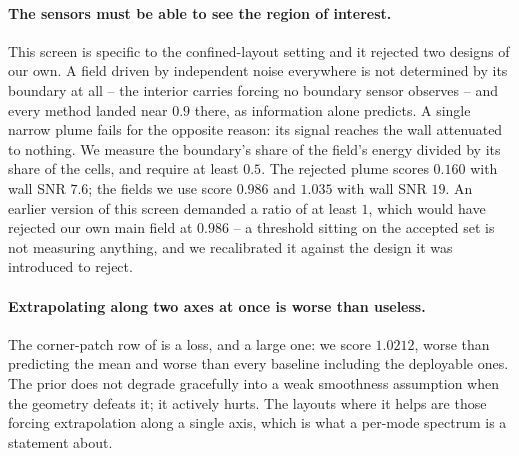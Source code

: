 \paragraph{The sensors must be able to see the region of interest.}
This screen is specific to the confined-layout setting and it rejected two
designs of our own.  A field driven by independent noise everywhere is not
determined by its boundary at all -- the interior carries forcing no boundary
sensor observes -- and every method landed near $0.9$ there, as information alone
predicts.  A single narrow plume fails for the opposite reason: its signal
reaches the wall attenuated to nothing.  We measure the boundary's share of the
field's energy divided by its share of the cells, and require at least $0.5$.
The rejected plume scores $0.160$ with wall SNR $7.6$; the fields we use score
$0.986$ and $1.035$ with wall SNR $19$.  An earlier version of this screen
demanded a ratio of at least $1$, which would have rejected our own main field at
$0.986$ -- a threshold sitting on the accepted set is not measuring anything, and
we recalibrated it against the design it was introduced to reject.

\paragraph{Extrapolating along two axes at once is worse than useless.}
The corner-patch row of  is a loss, and a large one: we score
$1.0212$, worse than predicting the mean and worse than every baseline including
the deployable ones.  The prior does not degrade gracefully into a weak
smoothness assumption when the geometry defeats it; it actively hurts.  The
layouts where it helps are those forcing extrapolation along a single axis, which
is what a per-mode spectrum is a statement about.

